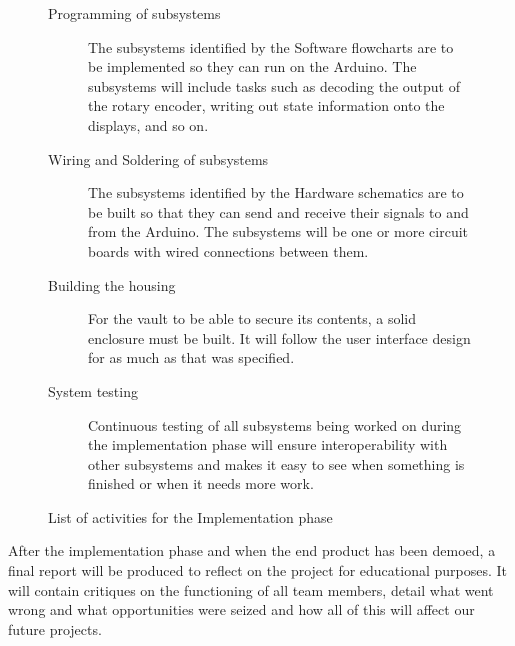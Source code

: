 \begin{figure}
\caption{List of activities for the Implementation phase}
\begin{description}
\item[Programming of subsystems] The subsystems identified by the Software flowcharts are to be implemented so they can run on the Arduino. The subsystems will include tasks such as decoding the output of the rotary encoder, writing out state information onto the displays, and so on.
\item[Wiring and Soldering of subsystems] The subsystems identified by the Hardware schematics are to be built so that they can send and receive their signals to and from the Arduino. The subsystems will be one or more circuit boards with wired connections between them.
\item[Building the housing] For the vault to be able to secure its contents, a solid enclosure must be built. It will follow the user interface design for as much as that was specified.
\item[System testing] Continuous testing of all subsystems being worked on during the implementation phase will ensure interoperability with other subsystems and makes it easy to see when something is finished or when it needs more work.
\end{description}
\label{lst:implementationactivities}
\end{figure}

After the implementation phase and when the end product has been demoed, a final report will be produced to reflect on the project for educational purposes. It will contain critiques on the functioning of all team members, detail what went wrong and what opportunities were seized and how all of this will affect our future projects.

